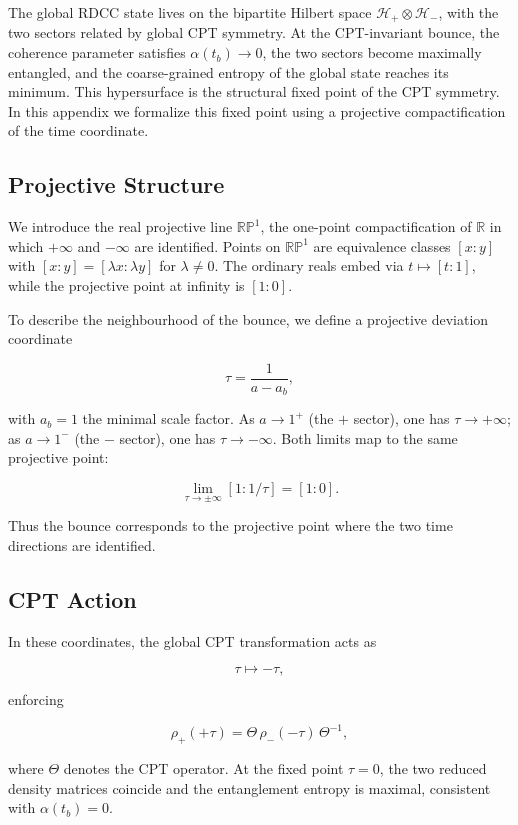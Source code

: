 \documentclass[11pt,a4paper]{article}
\newcommand{\Hglobal}{\mathcal{H}_+ \otimes \mathcal{H}_-}
\newcommand{\rplus}{\rho_+}
\newcommand{\rminus}{\rho_-}
\begin{document}
The global RDCC state lives on the bipartite Hilbert space \(\Hglobal\), with the
two sectors related by global CPT symmetry. At the CPT-invariant bounce, the
coherence parameter satisfies \(\alpha(t_b) \to 0\), the two sectors become
maximally entangled, and the coarse-grained entropy of the global state reaches
its minimum. This hypersurface is the structural fixed point of the CPT
symmetry. In this appendix we formalize this fixed point using a projective
compactification of the time coordinate.

\subsection*{Projective Structure}

We introduce the real projective line \(\mathbb{RP}^{1}\), the one-point
compactification of \(\mathbb{R}\) in which \(+\infty\) and \(-\infty\) are
identified. Points on \(\mathbb{RP}^{1}\) are equivalence classes \([x:y]\) with
\([x:y] = [\lambda x : \lambda y]\) for \(\lambda \neq 0\). The ordinary reals
embed via \(t \mapsto [t:1]\), while the projective point at infinity is
\([1:0]\).

To describe the neighbourhood of the bounce, we define a projective deviation
coordinate


\[
\tau = \frac{1}{a - a_b},
\]


with \(a_b = 1\) the minimal scale factor. As \(a \to 1^{+}\) (the \(+\) sector),
one has \(\tau \to +\infty\); as \(a \to 1^{-}\) (the \(-\) sector), one has
\(\tau \to -\infty\). Both limits map to the same projective point:


\[
\lim_{\tau \to \pm\infty} [1 : 1/\tau] = [1 : 0].
\]


Thus the bounce corresponds to the projective point where the two time
directions are identified.

\subsection*{CPT Action}

In these coordinates, the global CPT transformation acts as


\[
\tau \mapsto -\tau,
\]


enforcing


\[
\rplus(+\tau) = \Theta\, \rminus(-\tau)\, \Theta^{-1},
\]


where \(\Theta\) denotes the CPT operator. At the fixed point \(\tau = 0\), the
two reduced density matrices coincide and the entanglement entropy is maximal,
consistent with \(\alpha(t_b) = 0\).
\end{document}
